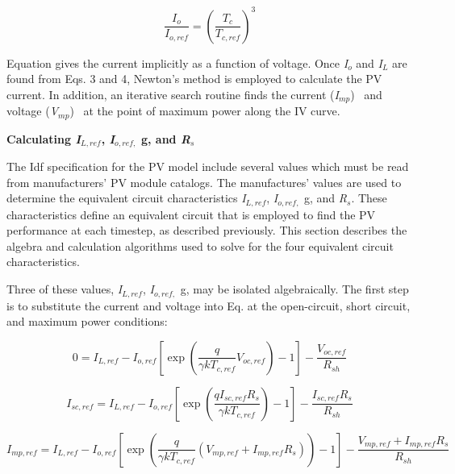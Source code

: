 \begin{equation}
\frac{{{I_o}}}{{{I_{o,ref}}}} = {\left( {\frac{{{T_c}}}{{{T_{c,ref}}}}} \right)^3}
\end{equation}

Equation gives the current implicitly as a function of voltage. Once \emph{I\(_{o}\)} and \emph{I\(_{L}\)} are found from Eqs. 3 and 4, Newton's method is employed to calculate the PV current. In addition, an iterative search routine finds the current (\emph{I\(_{mp}\)}) ~and voltage (\emph{V\(_{mp}\)})~ at the point of maximum power along the IV curve.

\textbf{Calculating \emph{I\(_{L,ref}\)}, \emph{I\(_{o,ref,}\)}} \textbf{g, and \emph{R\(_{s}\)}}

The Idf specification for the PV model include several values which must be read from manufacturers' PV module catalogs. The manufactures' values are used to determine the equivalent circuit characteristics \emph{I\(_{L,ref}\)}, \emph{I\(_{o,ref,}\)} g, and \emph{R\(_{s}\)}. These characteristics define an equivalent circuit that is employed to find the PV performance at each timestep, as described previously. This section describes the algebra and calculation algorithms used to solve for the four equivalent circuit characteristics.

Three of these values, \emph{I\(_{L,ref}\)}, \emph{I\(_{o,ref,}\)} g, may be isolated algebraically. The first step is to substitute the current and voltage into Eq. at the open-circuit, short circuit, and maximum power conditions:

\begin{equation}
0 = {I_{L,ref}} - {I_{o,ref}}\left[ {\exp \left( {\frac{q}{{\gamma k{T_{c,ref}}}}{V_{oc,ref}}} \right) - 1} \right] - \frac{{{V_{oc,ref}}}}{{{R_{sh}}}}
\end{equation}

\begin{equation}
{I_{sc,ref}} = {I_{L,ref}} - {I_{o,ref}}\left[ {\exp \left( {\frac{{q{I_{sc,ref}}{R_s}}}{{\gamma k{T_{c,ref}}}}} \right) - 1} \right] - \frac{{{I_{sc,ref}}{R_s}}}{{{R_{sh}}}}
\end{equation}

\begin{equation}
{I_{mp,ref}} = {I_{L,ref}} - {I_{o,ref}}\left[ {\exp \left( {\frac{q}{{\gamma k{T_{c,ref}}}}\left( {{V_{mp,ref}} + {I_{mp,ref}}{R_s}} \right)} \right) - 1} \right] - \frac{{{V_{mp,ref}} + {I_{mp,ref}}{R_s}}}{{{R_{sh}}}}
\end{equation}

